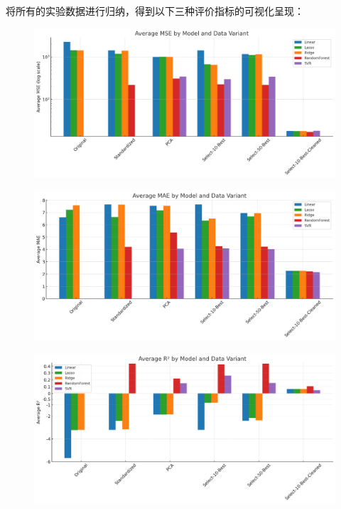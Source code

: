 \documentclass[10pt]{article}
\begin{document}
将所有的实验数据进行归纳，得到以下三种评价指标的可视化呈现：
\begin{figure}[H]
  \centering
  \includegraphics[width=0.8\linewidth]{average_mse.png}
  \label{fig:1}
\end{figure}
\begin{figure}[H]
  \centering
  \includegraphics[width=0.8\linewidth]{average_mae.png}
  \label{fig:2}
\end{figure}
\begin{figure}[H]
  \centering
  \includegraphics[width=0.8\linewidth]{average_R2.png}
  \label{fig:3}
\end{figure}
\end{document}
